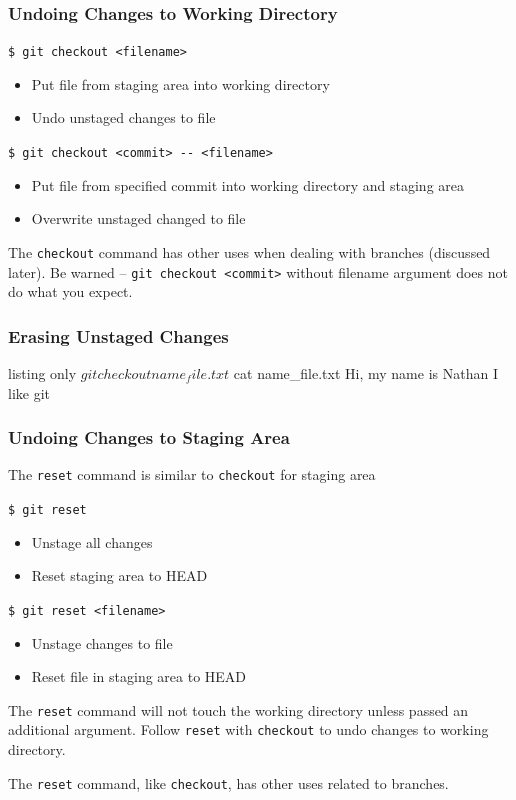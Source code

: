 \documentclass[english,compress]{beamer}
\begin{document}
\begin{frame}[fragile]
    \frametitle{Undoing Changes to Working Directory}

    \verb|$ git checkout <filename>|
    \begin{itemize}
        \item Put file from staging area into working directory
        \item Undo unstaged changes to file
    \end{itemize}
    \verb|$ git checkout <commit> -- <filename>|
    \begin{itemize}
        \item Put file from specified commit into working directory and
              staging area
        \item Overwrite unstaged changed to file
    \end{itemize}

    The \verb|checkout| command has other uses when dealing with branches
    (discussed later). Be warned -- \verb|git checkout <commit>| without
    filename argument does not do what you expect.
\end{frame}

\begin{frame}[fragile]
    \frametitle{Erasing Unstaged Changes}
    \begin{tcblisting}{listing only}
$ git checkout name_file.txt
$ cat name_file.txt
Hi, my name is Nathan
I like git
    \end{tcblisting}
\end{frame}

\begin{frame}[fragile]
    \frametitle{Undoing Changes to Staging Area}

    The \verb|reset| command is similar to \verb|checkout| for staging area

    \verb|$ git reset|
    \begin{itemize}
        \item Unstage all changes
        \item Reset staging area to HEAD
    \end{itemize}
    \verb|$ git reset <filename>|
    \begin{itemize}
        \item Unstage changes to file
        \item Reset file in staging area to HEAD
    \end{itemize}

    The \verb|reset| command will not touch the working directory unless
    passed an additional argument. Follow \verb|reset| with \verb|checkout|
    to undo changes to working directory.

    The \verb|reset| command, like \verb|checkout|, has other uses related
    to branches.
\end{frame}
\end{document}

